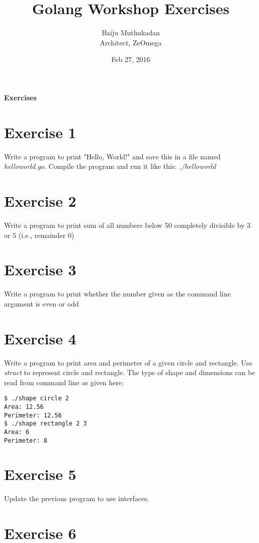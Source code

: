 \documentclass[11pt,a4paper]{article}
\title{\bf{Golang Workshop Exercises}}
\author{Baiju Muthukadan \\ Architect, ZeOmega}
\date{Feb 27, 2016}
\begin{document}
\maketitle

\vspace*{2cm}

\centerline{\LARGE\bf Exercises}
\section*{Exercise 1}
Write a program to print "Hello, World!" and save this in a
file named {\it helloworld.go}.  Compile the program and run
it like this: {\it./helloworld}

\section*{Exercise 2}

Write a program to print sum of all numbers below 50 completely
divisible by 3 or 5 (i.e., remainder 0)

\section*{Exercise 3}
Write a program to print whether the number given as the command line
argument is even or odd

\section*{Exercise 4}

Write a program to print area and perimeter of a given circle and
rectangle.  Use {\it struct} to represent circle and rectangle.  The
type of shape and dimensions can be read from command line as given
here:

\begin{verbatim}
$ ./shape circle 2
Area: 12.56
Perimeter: 12.56
$ ./shape rectangle 2 3
Area: 6
Perimeter: 8
\end{verbatim}

\section*{Exercise 5}

Update the previous program to use interfaces.

\section*{Exercise 6}
\end{document}
